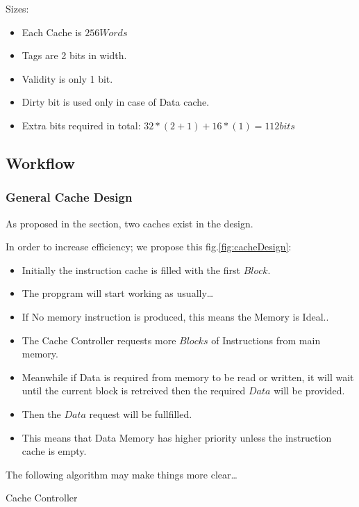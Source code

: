     Sizes:
    \begin{itemize}
        \item Each Cache is $256Words$
        \item Tags are 2 bits in width.
        \item Validity is only 1 bit.
        \item Dirty bit is used only in case of Data cache.
        \item Extra bits required in total: $32*(2+1) + 16*(1) = 112bits$
    \end{itemize}


\subsection{Workflow}
\label{workflowSection}
    \subsubsection{General Cache Design}
    As proposed in the  section, two caches exist in the design.

    In order to increase efficiency; we propose this fig.\ref{fig:cacheDesign}:
    \begin{itemize}
        \item Initially the instruction cache is filled with the first $Block$.
        \item The propgram will start working as usually\dots
        \item If No memory instruction is produced, this means the Memory is Ideal..
        \item The Cache Controller requests more $Blocks$ of Instructions from main memory.
        \item Meanwhile if Data is required from memory to be read or written, it will wait 
            until the current block is retreived then the required $Data$ will be provided.
        \item Then the $Data$ request will be fullfilled.
        \item This means that Data Memory has higher priority unless the instruction cache is empty.
    \end{itemize}

    The following algorithm may make things more clear\dots

    \begin{algorithm}[H]
        \SetAlgoLined
        \caption{Cache Controller}
        \end{algorithm}
    
